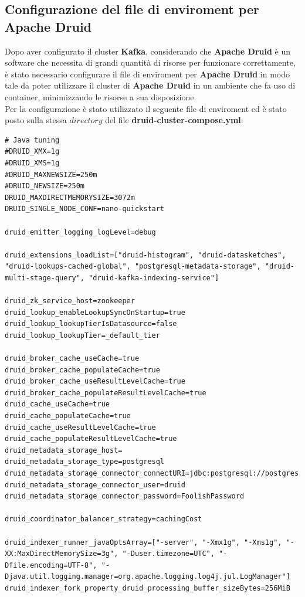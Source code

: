 \subsection{Configurazione del file di enviroment per Apache Druid}
Dopo aver configurato il \gls{cluster}{} \textbf{Kafka}, considerando che \textbf{Apache Druid} è un software che necessita di grandi quantità di risorse per funzionare correttamente, è 
stato necessario configurare il file di enviroment per \textbf{Apache Druid} in modo tale da poter utilizzare il \gls{cluster}{} di \textbf{Apache Druid} in un ambiente che fa uso di \gls{container}{}, minimizzando le risorse a sua disposizione.\\
Per la configurazione è stato utilizzato il seguente file di enviroment ed è stato posto sulla stessa $directory$ del file \textbf{druid-cluster-compose.yml}:
\begin{lstlisting}
# Java tuning
#DRUID_XMX=1g
#DRUID_XMS=1g
#DRUID_MAXNEWSIZE=250m
#DRUID_NEWSIZE=250m
DRUID_MAXDIRECTMEMORYSIZE=3072m
DRUID_SINGLE_NODE_CONF=nano-quickstart

druid_emitter_logging_logLevel=debug

druid_extensions_loadList=["druid-histogram", "druid-datasketches", "druid-lookups-cached-global", "postgresql-metadata-storage", "druid-multi-stage-query", "druid-kafka-indexing-service"]

druid_zk_service_host=zookeeper
druid_lookup_enableLookupSyncOnStartup=true
druid_lookup_lookupTierIsDatasource=false
druid_lookup_lookupTier=_default_tier

druid_broker_cache_useCache=true
druid_broker_cache_populateCache=true
druid_broker_cache_useResultLevelCache=true
druid_broker_cache_populateResultLevelCache=true
druid_cache_useCache=true
druid_cache_populateCache=true
druid_cache_useResultLevelCache=true
druid_cache_populateResultLevelCache=true
druid_metadata_storage_host=
druid_metadata_storage_type=postgresql
druid_metadata_storage_connector_connectURI=jdbc:postgresql://postgres:5432/druid
druid_metadata_storage_connector_user=druid
druid_metadata_storage_connector_password=FoolishPassword

druid_coordinator_balancer_strategy=cachingCost

druid_indexer_runner_javaOptsArray=["-server", "-Xmx1g", "-Xms1g", "-XX:MaxDirectMemorySize=3g", "-Duser.timezone=UTC", "-Dfile.encoding=UTF-8", "-Djava.util.logging.manager=org.apache.logging.log4j.jul.LogManager"]
druid_indexer_fork_property_druid_processing_buffer_sizeBytes=256MiB


\end{lstlisting}
